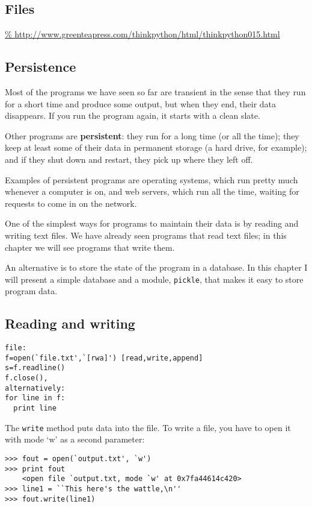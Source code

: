\documentclass{article}
\begin{document}
\begin{multicols}{2}
\section{Files}
\url{%
http://www.greenteapress.com/thinkpython/html/thinkpython015.html}
\subsection{Persistence}
Most of the programs we have seen so far are transient in the sense
that they run for a short time and produce some output, but when they
end, their data disappears. If you run the program again, it starts
with a clean slate.
\par Other programs are \textbf{persistent}: they run for a long time
(or all the time);
they keep at least some of their data in permanent storage (a
hard drive, for example); and if they shut down and restart, they pick
up where they left off.
\par Examples of persistent programs are operating systems, which run
pretty much whenever a computer is on, and web servers, which run all
the time, waiting for requests to come in on the network.
\par One of the simplest ways for programs to maintain their data is by
reading and writing text files. We have already seen programs that
read text files; in this chapter we will see programs that write them.
\par An alternative is to store the state of the program in a database. In
this chapter I will present a simple database and a module,
\verb|pickle|,
that makes it easy to store program data.

\subsection{Reading and writing}

\begin{lstlisting}
file:
f=open(`file.txt',`[rwa]') [read,write,append]
s=f.readline()
f.close(),
alternatively:
for line in f:
  print line
\end{lstlisting}
\par The \verb|write| method puts data into the file.
To write a file, you have to open it with mode `w' as a second parameter:

\begin{lstlisting}
>>> fout = open(`output.txt', `w')
>>> print fout
    <open file `output.txt, mode `w' at 0x7fa44614c420>
>>> line1 = ``This here's the wattle,\n''
>>> fout.write(line1)
\end{lstlisting}


\end{multicols}
\end{document}
